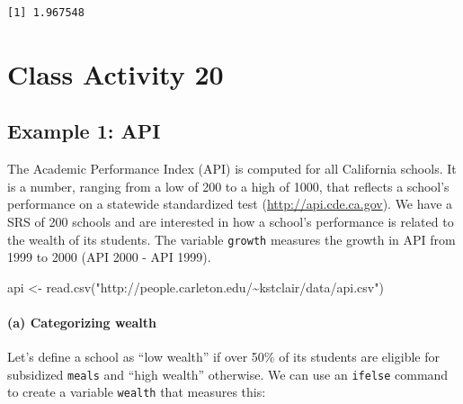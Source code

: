\documentclass[
]{book}
\newenvironment{Shaded}{\begin{snugshade}}{\end{snugshade}}
\newcommand{\DecValTok}[1]{\textcolor[rgb]{0.00,0.00,0.81}{#1}}
\newcommand{\FunctionTok}[1]{\textcolor[rgb]{0.00,0.00,0.00}{#1}}
\newcommand{\NormalTok}[1]{#1}
\newcommand{\OtherTok}[1]{\textcolor[rgb]{0.56,0.35,0.01}{#1}}
\newcommand{\SpecialCharTok}[1]{\textcolor[rgb]{0.00,0.00,0.00}{#1}}
\newcommand{\StringTok}[1]{\textcolor[rgb]{0.31,0.60,0.02}{#1}}
\begin{document}
\begin{verbatim}
[1] 1.967548
\end{verbatim}

\hypertarget{class-activity-20}{%
\chapter{Class Activity 20}\label{class-activity-20}}

\hypertarget{example-1-api}{%
\section{Example 1: API}\label{example-1-api}}

The Academic Performance Index (API) is computed for all California schools. It is a number, ranging from a low of 200 to a high of 1000, that reflects a school's performance on a statewide standardized test (\url{http://api.cde.ca.gov}). We have a SRS of 200 schools and are interested in how a school's performance is related to the wealth of its students. The variable \texttt{growth} measures the growth in API from 1999 to 2000 (API 2000 - API 1999).

\begin{Shaded}
\begin{Highlighting}[]
\NormalTok{api }\OtherTok{\textless{}{-}} \FunctionTok{read.csv}\NormalTok{(}\StringTok{"http://people.carleton.edu/\textasciitilde{}kstclair/data/api.csv"}\NormalTok{)}
\end{Highlighting}
\end{Shaded}

\hypertarget{a-categorizing-wealth}{%
\subsubsection{(a) Categorizing wealth}\label{a-categorizing-wealth}}

Let's define a school as ``low wealth'' if over 50\% of its students are eligible for subsidized \texttt{meals} and ``high wealth'' otherwise. We can use an \texttt{ifelse} command to create a variable \texttt{wealth} that measures this:

\begin{Shaded}
\end{Shaded}
\end{document}

